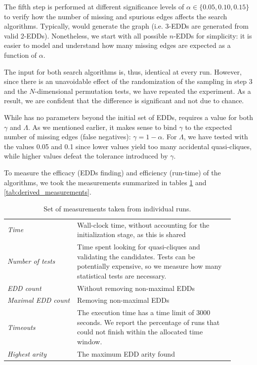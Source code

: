 The fifth step is performed at different significance levels of
$\alpha \in \{0.05, 0.10, 0.15\}$
to verify how the number of missing and spurious edges affects the search algorithms.
Typically, \Mind would generate the graph (i.e. 3-EDDs are generated from valid 2-EDDs).
Nonetheless, we start with all possible $n$-EDDs for simplicity: it is easier to
model and understand how many missing edges are expected as a function of $\alpha$.

The input for both search algorithms is, thus, identical at every run. However, since
there is an unavoidable effect of the randomization of the sampling in step 3 and the
$N$-dimensional permutation tests, we have repeated the experiment.
As a result, we are confident that the difference is significant and not due to chance.

While \Find has no parameters beyond the initial set of EDDs,
\PresQ requires a value for both $\gamma$ and $\Lambda$. As we mentioned earlier,
it makes sense to bind $\gamma$ to the expected number of missing edges
(false negatives): $\gamma = 1 - \alpha$. For $\Lambda$, we have tested with the
values 0.05 and 0.1 since lower values yield too many accidental quasi-cliques,
while higher values defeat the tolerance introduced by $\gamma$.

To measure the efficacy (EDDs finding) and efficiency (run-time) of the algorithms,
we took the measurements summarized in tables \ref{tab:raw_measurements}
and \ref{tab:derived_measurements}.

\begin{table}[tbp]
    \caption{Set of measurements taken from individual runs.}
    \label{tab:raw_measurements}
    \centering
    \begin{tabular}{p{0.28\linewidth} p{0.63\linewidth}}
        \emph{Time}  & Wall-clock time, without accounting for the initialization stage,
                       as this is shared \\
        \emph{Number of tests} & Time spent looking for quasi-cliques and validating the
                                   candidates.
                                   Tests can be potentially expensive, so we measure how many
                                   statistical tests are necessary. \\
        \emph{EDD count} & Without removing non-maximal EDDs \\
        \emph{Maximal EDD count} & Removing non-maximal EDDs \\
        \emph{Timeouts} & The execution time has a time limit of 3000 seconds. We report the
         percentage of runs that could not finish within the allocated time window. \\
        \emph{Highest arity} & The maximum EDD arity found \\
    \end{tabular}
\end{table}


